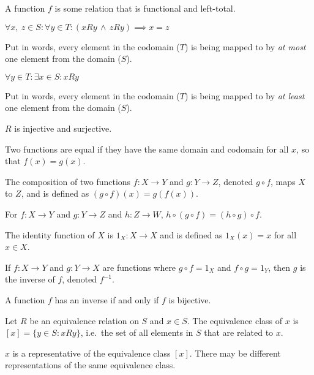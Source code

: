 \documentclass{article}
\begin{document}
\begin{definition}
    A function \(f\) is some relation that is functional and left-total.
\end{definition}
%
\begin{tcolorboxlarge}[title={Function Properties}]
    \begin{description}[style=sameline]
        \item[Injective (one-to-one)]
            \(\forall x,\: z \in S : \forall y \in T
                : (xRy \,\land\, zRy) \implies x = z\)

            Put in words, every element in the codomain (\(T\))
            is being mapped to by \textit{at most} one element from the domain (\(S\)).
        \item[Surjective (onto)]
            \(\forall y \in T : \exists x \in S : xRy\)

            Put in words, every element in the codomain (\(T\))
            is being mapped to by \textit{at least} one element from the domain (\(S\)).
        \item[Bijective]
            \(R\) is injective and surjective.
    \end{description}
\end{tcolorboxlarge}
%
\begin{definition}
    Two functions are equal if they have the same domain and codomain
    for all \(x\), so that \(f(x) = g(x)\).
\end{definition}
%
\begin{definition}
    The composition of two functions \(f:X \to Y\) and \(g:Y \to Z\),
    denoted \(g \circ f\), maps \(X\) to \(Z\), and is defined as
    \((g \circ f)(x) = g(f(x))\).
\end{definition}
%
\begin{theorem}
    For \(f:X \to Y\) and \(g:Y \to Z\) and  \(h:Z \to W\),
    \(h \circ (g \circ f) = (h \circ g) \circ f\).
\end{theorem}
%
\begin{definition}
    The identity function of \(X\) is \(1_X:X \to X\) and is defined as
    \(1_X (x)=x\) for all \(x \in X\).
\end{definition}
%
\begin{definition}
    If \(f:X \to Y\) and \(g:Y \to X\) are functions where
    \(g \circ f = 1_X\) and \(f \circ g = 1_Y\),
    then \(g\) is the inverse of \(f\), denoted \(f^{-1}\).
\end{definition}
%
\begin{theorem}
    A function \(f\) has an inverse if and only if \(f\) is bijective.
\end{theorem}
%
\begin{definition}
    Let \(R\) be an equivalence relation on \(S\) and \(x \in S\).
    The equivalence class of \(x\) is \([x] = \{y \in S : xRy\}\),
    i.e.\ the set of all elements in \(S\) that are related to \(x\).

    \(x\) is a representative of the equivalence class \([x]\).
    There may be different representations of the same equivalence class.
\end{definition}
%
\end{document}
